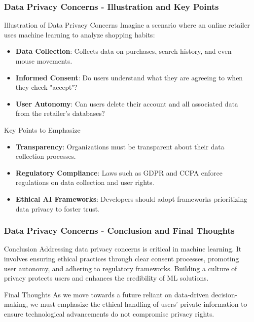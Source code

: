 \documentclass{beamer}
\begin{document}
\begin{frame}[fragile]
    \frametitle{Data Privacy Concerns - Illustration and Key Points}
    \begin{block}{Illustration of Data Privacy Concerns}
        Imagine a scenario where an online retailer uses machine learning to analyze shopping habits:
        \begin{itemize}
            \item \textbf{Data Collection}: Collects data on purchases, search history, and even mouse movements.
            \item \textbf{Informed Consent}: Do users understand what they are agreeing to when they check "accept"?
            \item \textbf{User Autonomy}: Can users delete their account and all associated data from the retailer's databases?
        \end{itemize}
    \end{block}

    \begin{block}{Key Points to Emphasize}
        \begin{itemize}
            \item \textbf{Transparency}: Organizations must be transparent about their data collection processes.
            \item \textbf{Regulatory Compliance}: Laws such as GDPR and CCPA enforce regulations on data collection and user rights.
            \item \textbf{Ethical AI Frameworks}: Developers should adopt frameworks prioritizing data privacy to foster trust.
        \end{itemize}
    \end{block}
\end{frame}

\begin{frame}[fragile]
    \frametitle{Data Privacy Concerns - Conclusion and Final Thoughts}
    \begin{block}{Conclusion}
        Addressing data privacy concerns is critical in machine learning. It involves ensuring ethical practices through 
        clear consent processes, promoting user autonomy, and adhering to regulatory frameworks. 
        Building a culture of privacy protects users and enhances the credibility of ML solutions.
    \end{block}

    \begin{block}{Final Thoughts}
        As we move towards a future reliant on data-driven decision-making, we must emphasize the ethical handling of 
        users' private information to ensure technological advancements do not compromise privacy rights.
    \end{block}
\end{frame}
\end{document}
